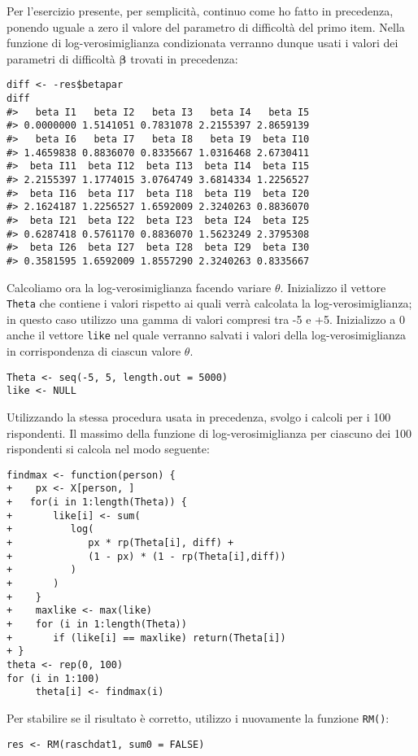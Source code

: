 Per l'esercizio presente, per semplicità, continuo come ho fatto in precedenza, ponendo uguale a zero il valore del parametro di difficoltà del primo item. Nella funzione di log-verosimiglianza condizionata verranno dunque usati i valori dei parametri di difficoltà  $\boldsymbol{\beta}$ trovati in precedenza:
\begin{lstlisting}
diff <- -res$betapar 
diff
#>   beta I1   beta I2   beta I3   beta I4   beta I5 
#> 0.0000000 1.5141051 0.7831078 2.2155397 2.8659139 
#>   beta I6   beta I7   beta I8   beta I9  beta I10 
#> 1.4659838 0.8836070 0.8335667 1.0316468 2.6730411 
#>  beta I11  beta I12  beta I13  beta I14  beta I15 
#> 2.2155397 1.1774015 3.0764749 3.6814334 1.2256527 
#>  beta I16  beta I17  beta I18  beta I19  beta I20 
#> 2.1624187 1.2256527 1.6592009 2.3240263 0.8836070 
#>  beta I21  beta I22  beta I23  beta I24  beta I25 
#> 0.6287418 0.5761170 0.8836070 1.5623249 2.3795308 
#>  beta I26  beta I27  beta I28  beta I29  beta I30 
#> 0.3581595 1.6592009 1.8557290 2.3240263 0.8335667 
\end{lstlisting} 
Calcoliamo ora la log-verosimiglianza facendo variare $\theta$.  Inizializzo il vettore {\tt Theta} che contiene i valori rispetto ai quali verrà calcolata la log-verosimiglianza;   in questo caso utilizzo una gamma di valori compresi tra -5 e +5. Inizializzo a 0 anche il vettore {\tt like} nel quale verranno salvati i valori della log-verosimiglianza in corrispondenza di ciascun valore $\theta$.
\begin{lstlisting}
Theta <- seq(-5, 5, length.out = 5000)
like <- NULL
\end{lstlisting} 
\medskip
Utilizzando la stessa procedura usata in precedenza, svolgo i calcoli per i 100 rispondenti. Il massimo della funzione di log-verosimiglianza per ciascuno dei 100 rispondenti si calcola nel modo seguente:
\medskip
\begin{lstlisting}
findmax <- function(person) {
+    px <- X[person, ]
+   for(i in 1:length(Theta)) {
+       like[i] <- sum(
+          log(
+             px * rp(Theta[i], diff) +
+             (1 - px) * (1 - rp(Theta[i],diff))
+          )
+       )
+    }
+    maxlike <- max(like)
+    for (i in 1:length(Theta)) 
+       if (like[i] == maxlike) return(Theta[i])
+ }
theta <- rep(0, 100)
for (i in 1:100) 
     theta[i] <- findmax(i)
\end{lstlisting} 
Per stabilire se il risultato è corretto, utilizzo i nuovamente la funzione {\tt RM()}:
\begin{lstlisting}
res <- RM(raschdat1, sum0 = FALSE)
\end{lstlisting} 
